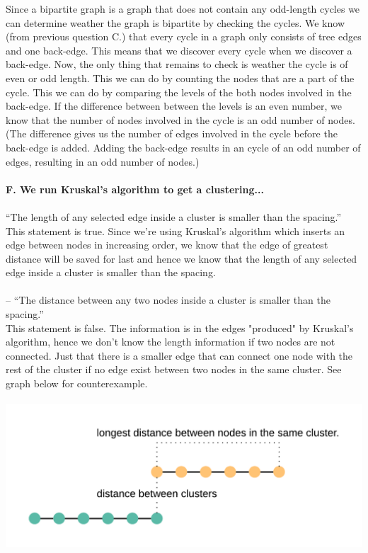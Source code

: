 \documentclass[12pt,oneside,reqno]{amsart}
\begin{document}
Since a bipartite graph is a graph that does not contain any odd-length cycles we can determine weather the graph is bipartite by checking the cycles. We know (from previous question C.) that every cycle in a graph only consists of tree edges and one back-edge. This means that we discover every cycle when we discover a back-edge. Now, the only thing that remains to check is weather the cycle is of even or odd length. This we can do by counting the nodes that are a part of the cycle. This we can do by comparing the levels of the both nodes involved in the back-edge. If the difference between between the levels is an even number, we know that the number of nodes involved in the cycle is an odd number of nodes. (The difference gives us the number of edges involved in the cycle before the back-edge is added. Adding the back-edge results in an cycle of an odd number of edges, resulting in an odd number of nodes.)\\\\
\newpage
\textbf{F. We run Kruskal’s algorithm to get a clustering...}\\\\
“The length of any selected edge inside a cluster is smaller than the spacing.”\\
This statement is true. Since we're using Kruskal's algorithm which inserts an edge between nodes in increasing order, we know that the edge of greatest distance will be saved for last and hence we know that the length of any selected edge inside a cluster is smaller than the spacing.\\\\
 – “The distance between any two nodes inside a cluster is smaller than the spacing.”\\
 This statement is false. The information is in the edges "produced" by Kruskal's algorithm, hence we don't know the length information if two nodes are not connected. Just that there is a smaller edge that can connect one node with the rest of the cluster if no edge exist between two nodes in the same cluster. See graph below for counterexample.\\\\
\includegraphics[scale=1.5]{cluster.png}\\
\end{document}
